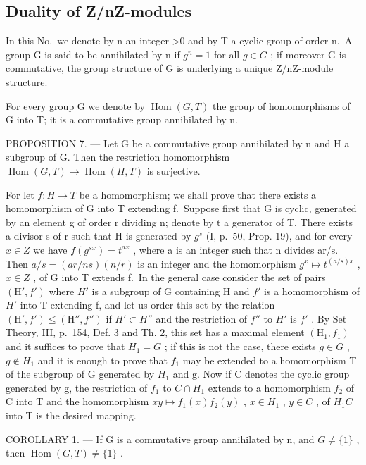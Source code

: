 \subsection{Duality of Z/nZ-modules}

In this No.~we denote by n an integer \textgreater0 and by T a cyclic group of order n.~A group G is said to be annihilated by n if \(g^{n}=1\) for all \(g\in G\) ; if moreover G is commutative, the group structure of G is underlying a unique Z/nZ-module structure.

For every group G we denote by \(\operatorname{Hom}(G, T)\) the group of homomorphisms of G into T; it is a commutative group annihilated by n.

PROPOSITION 7. --- Let G be a commutative group annihilated by n and H a subgroup of G. Then the restriction homomorphism \(\operatorname{Hom}(G, T) \to \operatorname{Hom}(H, T)\) is surjective.

For let \(f:H\to T\) be a homomorphism; we shall prove that there exists a homomorphism of G into T extending f.~Suppose first that G is cyclic, generated by an element g of order r dividing n; denote by t a generator of T. There exists a divisor s of r such that H is generated by \(g^{s}\) (I, p.~50, Prop. 19), and for every \(x \in Z\) we have \(f(g^{sx}) = t^{ax}\) , where a is an integer such that n divides ar/s. Then \(a/s = (ar/ns)(n/r)\) is an integer and the homomorphism \(g^{x} \mapsto t^{(a/s)x}\) , \(x \in Z\) , of G into T extends f.~In the general case consider the set of pairs \((\mathrm{H}', f')\) where \(H'\) is a subgroup of G containing H and \(f'\) is a homomorphism of \(H'\) into T extending f, and let us order this set by the relation \((\mathrm{H}', f') \leqslant (\mathrm{H}'', f'')\) if \(H' \subset H''\) and the restriction of \(f''\) to \(H'\) is \(f'\) . By Set Theory, III, p.~154, Def. 3 and Th. 2, this set has a maximal element \((\mathrm{H}_{1}, f_{1})\) and it suffices to prove that \(H_{1} = G\) ; if this is not the case, there exists \(g \in G\) , \(g \notin H_{1}\) and it is enough to prove that \(f_{1}\) may be extended to a homomorphism T of the subgroup of G generated by \(H_{1}\) and g. Now if C denotes the cyclic group generated by g, the restriction of \(f_{1}\) to \(C \cap H_{1}\) extends to a homomorphism \(f_{2}\) of C into T and the homomorphism \(xy \mapsto f_{1}(x) f_{2}(y)\) , \(x \in H_{1}\) , \(y \in C\) , of \(H_{1}C\) into T is the desired mapping.

COROLLARY 1. --- If G is a commutative group annihilated by n, and \(G \neq \{1\}\) , then \(\operatorname{Hom}(G, T) \neq \{1\}\) .

